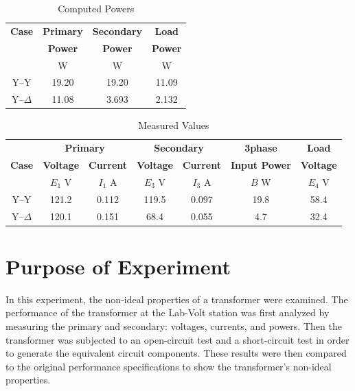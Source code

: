 \documentclass{article}
\begin{document}
\begin{table}[H]
  \centering
  \begin{tabular}{*{4}{c}}
    \textbf{Case} & \textbf{Primary} & \textbf{Secondary} & \textbf{Load} \\

    & \textbf{Power} & \textbf{Power} & \textbf{Power} \\

    & W & W & W \\
    \hline

    Y--Y        & 19.20 & 19.20 & 11.09 \\
    Y--$\Delta$ & 11.08 & 3.693 & 2.132 \\
  \end{tabular}
  \caption{Computed Powers}
  \label{tab:pow_comp}
\end{table}

\begin{table}[H]
  \centering
  \begin{tabular}{*{7}{c}}
    & \multicolumn{2}{c}{\textbf{Primary}} &
    \multicolumn{2}{c}{\textbf{Secondary}} & \textbf{3phase} & \textbf{Load} \\

    \textbf{Case} & \textbf{Voltage} & \textbf{Current} & \textbf{Voltage} &
    \textbf{Current} & \textbf{Input Power} & \textbf{Voltage} \\

    & $E_1$ V & $I_1$ A & $E_3$ V & $I_3$ A & $B$ W & $E_4$ V \\

    \hline
    Y--Y        & 121.2 & 0.112 & 119.5 & 0.097 & 19.8 & 58.4 \\
    Y--$\Delta$ & 120.1 & 0.151 & 68.4 & 0.055 & 4.7 & 32.4 \\
  \end{tabular}
  \caption{Measured Values}
  \label{tab:results}
\end{table}
\section{Purpose of Experiment}

In this experiment, the non-ideal properties of a transformer were examined.
The performance of the transformer at the Lab-Volt station was first analyzed
by measuring the primary and secondary: voltages, currents, and powers. Then
the transformer was subjected to an open-circuit test and a short-circuit test
in order to generate the equivalent circuit components. These results were then
compared to the original performance specifications to show the transformer's
non-ideal properties.
\end{document}
